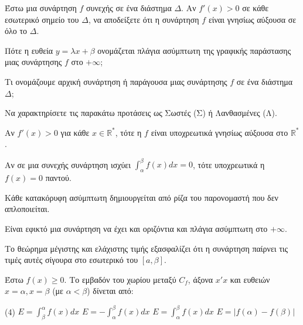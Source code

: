 \documentclass[11pt,a4paper]{article}
\newcommand{\kerkissans}[1]{{\fontfamily{maksf}\selectfont \textbf{#1}}}
\renewcommand{\textdexiakeraia}{}
\newcommand{\dint}{\displaystyle\int}
\newcommand\themanum{A}
\newcounter{thema}[section]
\renewcommand{\thethema}{\arabic{thema}}
\newcommand{\Thema}{\refstepcounter{thema}{\textbf{\textcolor{black}{\faPenSquare\ \  \large \kerkissans{\textbf{\thethemaο\hspace{2mm}Θέμα}}}}}\hspace{0mm}}{}
\newenvironment{thema}[1]
{\begin{tcolorbox}[title=\Thema\kerkissans{\textbf{\large{  #1}}},breakable,
enhanced standard,titlerule=0pt,toprule=0pt, rightrule=0pt, bottomrule=0pt,
colback=white,left=0mm,top=1mm,bottom=0mm,
boxrule=0pt,
colframe=white,leftrule=0mm,sharp corners,coltitle=black]
\renewcommand{\themanum}{#1}}
{\end{tcolorbox}}
\begin{document}
\begin{thema}{A}
\begin{erwthma}
    \item Έστω μια συνάρτηση $f$ συνεχής σε ένα διάστημα $\Delta$. Αν $f'(x)>0$ σε κάθε εσωτερικό σημείο του $\Delta$, να αποδείξετε ότι η συνάρτηση $f$ είναι γνησίως αύξουσα σε όλο το $\Delta$.
    \item Πότε η ευθεία $y=\lambda x+\beta$ ονομάζεται πλάγια ασύμπτωτη της γραφικής παράστασης μιας συνάρτησης $f$ στο $+\infty$;
    \item Τι ονομάζουμε αρχική συνάρτηση ή παράγουσα μιας συνάρτησης $f$ σε ένα διάστημα $\Delta$;
    \item Να χαρακτηρίσετε τις παρακάτω προτάσεις ως Σωστές (Σ) ή Λανθασμένες (Λ).
    \begin{alist}
        \item Αν $f'(x)>0$ για κάθε $x \in \mathbb{R}^*$, τότε η $f$ είναι υποχρεωτικά γνησίως αύξουσα στο $\mathbb{R}^*$.
        \item Αν σε μια συνεχής συνάρτηση ισχύει $\int_\alpha^\beta f(x) dx = 0$, τότε υποχρεωτικά η $f(x)=0$ παντού.
        \item Κάθε κατακόρυφη ασύμπτωτη δημιουργείται από ρίζα του παρονομαστή που δεν απλοποιείται.
        \item Είναι εφικτό μια συνάρτηση να έχει και οριζόντια και πλάγια ασύμπτωτη στο $+\infty$.
        \item Το θεώρημα μέγιστης και ελάχιστης τιμής εξασφαλίζει ότι η συνάρτηση παίρνει τις τιμές αυτές σίγουρα στο εσωτερικό του $[a, \beta]$.
    \end{alist}
    \item Έστω $f(x) \ge 0$. Το εμβαδόν του χωρίου μεταξύ $C_f$, άξονα $x'x$ και ευθειών $x=\alpha, x=\beta$ (με $\alpha<\beta$) δίνεται από:
    \begin{tasks}[label=\let\textdexiakeraia\relax\alph*.](4)
        \task $E = \dint_\beta^\alpha f(x) dx$
        \task $E = - \dint_\alpha^\beta f(x) dx$
        \task $E = \dint_\alpha^\beta f(x) dx$
        \task $E = |f(\alpha) - f(\beta)|$
    \end{tasks}
\end{erwthma}
\end{thema}
\vspace{1cm}
\end{document}
